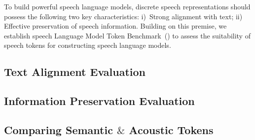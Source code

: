 

To build powerful speech language models, discrete speech representations should possess the following two key characteristics: i)~Strong alignment with text; ii) Effective preservation of speech information. Building on this premise, we establish speech Language Model Token Benchmark~(\bench) to assess the suitability of speech tokens for constructing speech language models. 

\subsection{Text Alignment Evaluation}
\label{sec:026_information principle}



\subsection{Information Preservation Evaluation}
\label{sec:027_bench_resys}



\subsection{Comparing Semantic $\&$ Acoustic Tokens}
\label{sec:028_bench_results}





